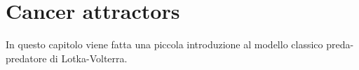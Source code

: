 \chapter{Cancer attractors}
\lhead[\fancyplain{}{\bfseries\thepage}]{\fancyplain{}{\bfseries\rightmark}}

\newenvironment{sistema}%
{\left\lbrace\begin{array}{@{}l@{}}}%
{\end{array}\right.}
In questo capitolo viene fatta una piccola introduzione al modello classico preda-predatore di Lotka-Volterra.


\section{}


